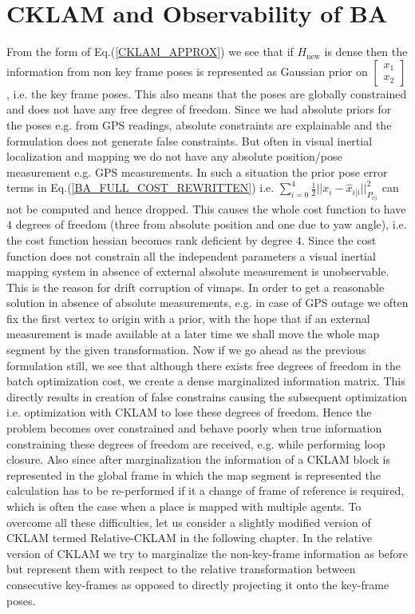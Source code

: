 \section{CKLAM and Observability of BA}
\label{cklamObservability}
From the form of Eq.(\ref{CKLAM_APPROX}) we see that if $H_\mathrm{new}$ is dense then the information from non key frame poses is represented as Gaussian prior on $\begin{bmatrix} x_{1} \\ x_{2} \end{bmatrix}$, i.e. the key frame poses. This also means that the poses are globally constrained and does not have any free degree of freedom. Since we had absolute priors for the poses e.g. from GPS readings, absolute constraints are explainable and the formulation does not generate false constraints. But often in visual inertial localization and mapping we do not have any absolute position/pose measurement e.g. GPS measurements. In such a situation the prior pose error terms in Eq.(\ref{BA_FULL_COST_REWRITTEN}) i.e. $\sum_{i=0}^4 \frac{1}{2}||x_i-\hat x_{i|i}||^2_{P_{i|i}}$ can not be computed and hence dropped. This causes the whole cost function to have $4$ degrees of freedom (three from absolute position and one due to yaw angle), i.e. the cost function hessian becomes rank deficient by degree $4$. Since the cost function does not constrain all the independent parameters a visual inertial mapping system in absence of external absolute measurement is unobservable. This is the reason for drift corruption of vimaps. In order to get a reasonable solution in absence of absolute measurements, e.g. in case of GPS outage we often fix the first vertex to origin with a prior, with the hope that if an external measurement is made available at a later time we shall move the whole map segment by the given transformation. Now if we go ahead as the previous formulation still, we see that although there exists free degrees of freedom in the batch optimization cost, we create a dense marginalized information matrix. This directly results in creation of false constrains causing the subsequent optimization i.e. optimization with CKLAM to lose these degrees of freedom. Hence the problem becomes over constrained and behave poorly when true information constraining these degrees of freedom are received, e.g. while performing loop closure. Also since after marginalization the information of a CKLAM block is represented in the global frame in which the map segment is represented the calculation has to be re-performed if it a change of frame of reference is required, which is often the case when a place is mapped with multiple agents. To overcome all these difficulties, let us consider a slightly modified version of CKLAM termed Relative-CKLAM in the following chapter. In the relative version of CKLAM we try to marginalize the non-key-frame information as before but represent them with respect to the relative transformation between consecutive key-frames as opposed to directly projecting it onto the key-frame poses.

